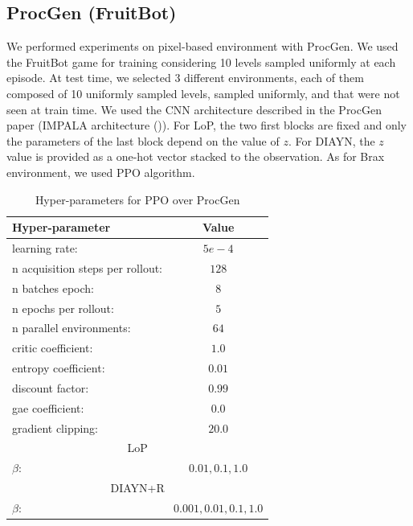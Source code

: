 \newpage
\subsection{ProcGen (FruitBot)}
\label{subsec:procgen}

We performed experiments on pixel-based environment with ProcGen. We used the FruitBot game for training considering 10 levels sampled uniformly at each episode. At test time, we selected 3 different environments, each of them composed of 10 uniformly sampled levels, sampled uniformly, and that were not seen at train time. We used the CNN architecture described in the ProcGen paper (IMPALA architecture (\cite{espeholt2018impala})). For LoP, the two first blocks are fixed and only the parameters of the last block depend on the value of $z$. For DIAYN, the $z$ value is provided as a one-hot vector stacked to the observation. As for Brax environment, we used PPO algorithm.




\begin{table}[h!]
\begin{center}
\begin{tabular}{l|c} \toprule
   \textbf{Hyper-parameter} & \textbf{Value} \\ \hline
    learning rate: &  $5e-4$\\
    n acquisition steps per rollout: & $128$ \\
    n batches epoch: & $8$ \\
    n epochs per rollout: & $5$ \\
    n parallel environments: &  $64$\\
    critic coefficient: &  $1.0$\\
    entropy coefficient: &  $0.01$\\
    discount factor: &  $0.99$\\
    gae coefficient: &  $0.0$\\
    gradient clipping: & $20.0$ \\ 
    \multicolumn{2}{c}{LoP} \\ \hline
    $\beta$: & $0.01,0.1,1.0$ \\ \toprule
    \multicolumn{2}{c}{DIAYN+R} \\ \hline
    $\beta$: & $0.001,0.01,0.1,1.0$ \\ \hline
\end{tabular}
\end{center}
\caption{Hyper-parameters for PPO over ProcGen}
\label{table:hp_procgen}
\end{table}



